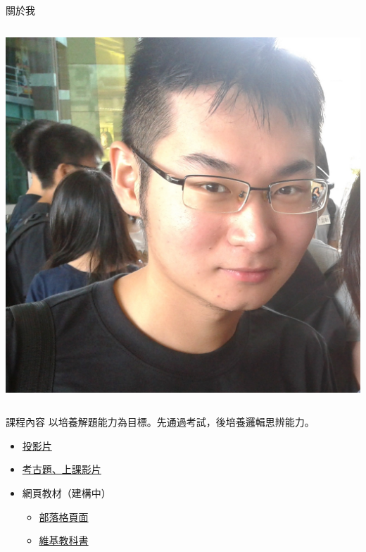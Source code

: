 \documentclass{Slideshow}
\begin{document}
\begin{frame}{關於我}
\begin{columns}[onlytextwidth]
        \begin{column}{0.4\textwidth}
            \begin{flushleft}
                \newlength{\stickerwidth}
                \setlength{\stickerwidth}{\columnwidth - 1em}
                \includegraphics[width=\stickerwidth]{Introduction/sticker.jpg}
            \end{flushleft}
        \end{column}
    \end{columns}
\end{frame}

\begin{frame}{課程內容}
    以培養解題能力為目標。先通過考試，後培養邏輯思辨能力。

    \begin{itemize}
        \item \href{https://jdh8.github.io/calculus-slides/}{投影片}
        \item \href{http://jdh8.org/category/calculus-course/}{考古題、上課影片}
        \item 網頁教材（建構中）
            \begin{itemize}
                \item \href{http://jdh8.org/calculus/}{部落格頁面}
                \item \href{https://zh.wikibooks.org/wiki/\%E5\%BE\%AE\%E7\%A7\%AF\%E5\%88\%86\%E5\%AD\%A6}{維基教科書}
            \end{itemize}
    \end{itemize}
\end{frame}
\end{document}
